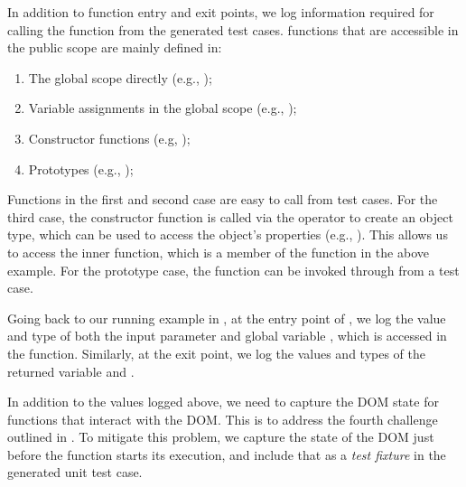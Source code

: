 In addition to function entry and exit points, we log information required for calling  the function from the generated test cases. %
\javascript functions that are accessible in the public scope are mainly defined in:
\begin{enumerate}
\item The global scope directly (e.g., );
\item Variable assignments in the global scope (e.g., );
\item Constructor functions (e.g,  );
\item Prototypes (e.g., ); 
\end{enumerate}
Functions in the first and second case are easy to call from test cases. For the third case, the constructor function is called via the  operator to create an object type, which can be used to access the object's properties
(e.g., ).
This allows us to access the inner function, which is a member of the  function in the above example.
For the prototype case, the function can be invoked through  from a test case.

Going back to our running example in , at the entry point of , we log the value and type of both the input parameter  and global variable , which is accessed in the function. Similarly, at the exit point, we log the values and types of the returned variable  and .

In addition to the values logged above, we need to capture the DOM state for functions that interact with the DOM. This is to address the fourth challenge outlined in .
To mitigate this problem, we capture the state of the DOM just before the function starts its execution, and include that as a \emph{test fixture} \cite{quint} in the generated unit test case.

